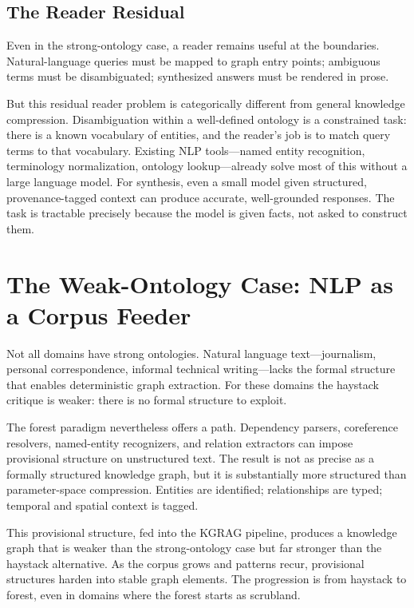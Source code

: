 \documentclass{article}
\begin{document}
\subsection{The Reader Residual}

Even in the strong-ontology case, a reader remains useful at the boundaries.
Natural-language queries must be mapped to graph entry points; ambiguous terms
must be disambiguated; synthesized answers must be rendered in prose.

But this residual reader problem is categorically different from general
knowledge compression.  Disambiguation within a well-defined ontology is a
constrained task: there is a known vocabulary of entities, and the reader's job
is to match query terms to that vocabulary.  Existing NLP tools---named entity
recognition, terminology normalization, ontology lookup---already solve most of
this without a large language model.  For synthesis, even a small model given
structured, provenance-tagged context can produce accurate, well-grounded
responses.  The task is tractable precisely because the model is given facts, not
asked to construct them.

\section{The Weak-Ontology Case: NLP as a Corpus Feeder}

Not all domains have strong ontologies.  Natural language text---journalism,
personal correspondence, informal technical writing---lacks the formal structure
that enables deterministic graph extraction.  For these domains the haystack
critique is weaker: there is no formal structure to exploit.

The forest paradigm nevertheless offers a path.  Dependency parsers, coreference
resolvers, named-entity recognizers, and relation extractors can impose
provisional structure on unstructured text.  The result is not as precise as a
formally structured knowledge graph, but it is substantially more structured than
parameter-space compression.  Entities are identified; relationships are typed;
temporal and spatial context is tagged.

This provisional structure, fed into the KGRAG pipeline, produces a knowledge
graph that is weaker than the strong-ontology case but far stronger than the
haystack alternative.  As the corpus grows and patterns recur, provisional
structures harden into stable graph elements.  The progression is from haystack
to forest, even in domains where the forest starts as scrubland.
\end{document}
